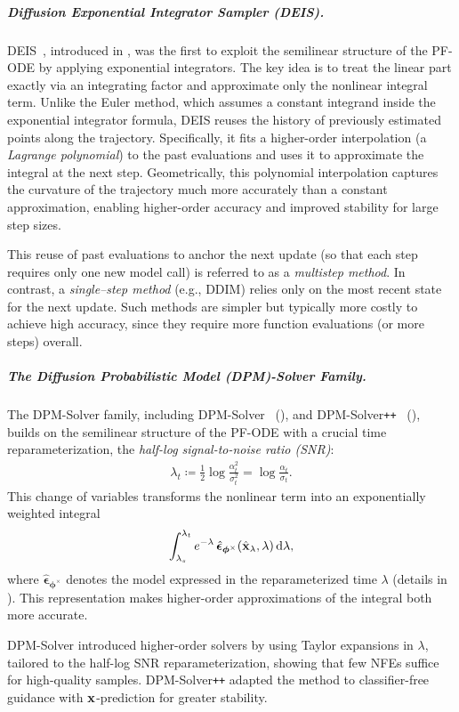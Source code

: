 \subparagraph{Diffusion Exponential Integrator Sampler (DEIS).} 
DEIS~\citep{zhang2022fast}, introduced in , was the first to exploit the semilinear structure of the PF-ODE by applying exponential integrators. The key idea is to treat the linear part exactly via an integrating factor and approximate only the nonlinear integral term. Unlike the Euler method, which assumes a constant integrand inside the exponential integrator formula, DEIS reuses the history of previously estimated points along the trajectory. Specifically, it fits a higher-order interpolation (a \emph{Lagrange polynomial}) to the past evaluations and uses it to approximate the integral at the next step.  Geometrically, this polynomial interpolation captures the curvature of the trajectory much more accurately than a constant approximation, enabling higher-order accuracy and improved stability for large step sizes.

This reuse of past evaluations to anchor the next update (so that each
step requires only one new model call) is referred to as a
\emph{multistep method}. In contrast, a \emph{single–step method}
(e.g., DDIM) relies only on the most recent state for the next update.
Such methods are simpler but typically more costly to achieve high
accuracy, since they require more function evaluations (or more steps)
overall.

\subparagraph{The Diffusion Probabilistic Model (DPM)-Solver Family.} 
The DPM-Solver family, including DPM-Solver~\citep{lu2022dpm} (), and DPM-Solver\texttt{++}~\citep{lu2022dpm2} (), builds on the semilinear structure of the PF-ODE with a crucial time reparameterization, the \emph{half-log signal-to-noise ratio (SNR)}:
\begin{align*}
    \lambda_t \coloneqq \frac{1}{2}\log \frac{\alpha_t^2}{\sigma_t^2} = \log \frac{\alpha_t}{\sigma_t}.
\end{align*}
This change of variables transforms the nonlinear term into an exponentially weighted integral
\[
\int_{\lambda_s}^{\lambda_t} e^{-\lambda}\,\hat{\bm{\epsilon}}_{\bm{\phi}^\times}(\hat{{\mathbf{x}}}_\lambda,\lambda) \mathop{}\!\mathrm{d} \lambda,
\]
where $\hat{\bm{\epsilon}}_{\bm{\phi}^\times}$ denotes the model expressed in the reparameterized time $\lambda$ (details in ).  
This representation makes higher-order approximations of the  integral both more accurate.  

DPM-Solver introduced higher-order solvers by using Taylor expansions in $\lambda$, tailored to the half-log SNR reparameterization, showing that few NFEs suffice for high-quality samples. DPM-Solver\texttt{++} adapted the method to classifier-free guidance with ${\mathbf{x}}$-prediction for greater stability. 








